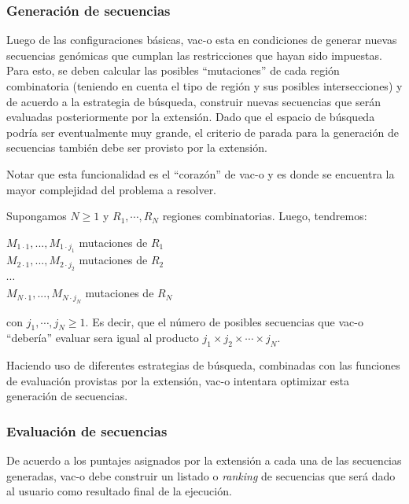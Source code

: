 \documentclass[10pt,a4paper]{article}
\begin{document}
  \subsubsection{Generaci\'on de secuencias}
  Luego de las configuraciones b\'asicas, vac-o esta en condiciones de generar
nuevas secuencias gen\'omicas que cumplan las restricciones que hayan sido
impuestas. Para esto, se deben calcular las posibles ``mutaciones'' de cada
regi\'on combinatoria (teniendo en cuenta el tipo de regi\'on y sus posibles
intersecciones) y de acuerdo a la estrategia de b\'usqueda, construir nuevas
secuencias que ser\'an evaluadas posteriormente por la extensi\'on. Dado que el
espacio de b\'usqueda podr\'ia ser eventualmente muy grande, el criterio de
parada para la generaci\'on de secuencias tambi\'en debe ser provisto por la
extensi\'on.

  Notar que esta funcionalidad es el ``coraz\'on'' de vac-o y es donde se
encuentra la mayor complejidad del problema a resolver. 

  Supongamos $N \geqslant 1$ y $R_{1}, \cdots, R_{N}$ regiones combinatorias.
Luego, tendremos: \\
  \begin{center}    
    $M_{1\cdot1},..., M_{1\cdot j_{1}}$ mutaciones de $R_{1}$\\ 
    $M_{2\cdot1},..., M_{2\cdot j_{2}}$ mutaciones de $R_{2}$\\
    $\cdots$ \\
    $M_{N\cdot1},..., M_{N\cdot j_{N}}$ mutaciones de $R_{N}$   
  \end{center}
  con $j_{1}, \cdots, j_{N} \geqslant 1$. Es decir, que el n\'umero de posibles
secuencias que vac-o ``deber\'ia'' evaluar sera igual al producto $j_{1} \times
j_{2} \times \cdots \times j_{N}$. 

  Haciendo uso de diferentes estrategias de b\'usqueda, combinadas con las
funciones de evaluaci\'on provistas por la extensi\'on, vac-o intentara
optimizar esta generaci\'on de secuencias.

  \subsubsection{Evaluaci\'on de secuencias}
  De acuerdo a los puntajes asignados por la extensi\'on a cada una de las
secuencias generadas, vac-o debe construir un listado o \textit{ranking} de
secuencias que ser\'a dado al usuario como resultado final de la ejecuci\'on.
\end{document}
